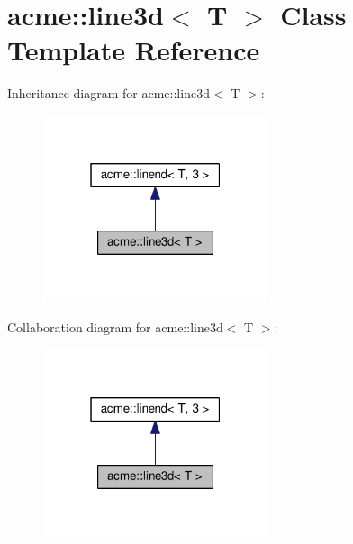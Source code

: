 \hypertarget{classacme_1_1line3d}{}\section{acme\+:\+:line3d$<$ T $>$ Class Template Reference}
\label{classacme_1_1line3d}


Inheritance diagram for acme\+:\+:line3d$<$ T $>$\+:
\nopagebreak
\begin{figure}[H]
\begin{center}
\leavevmode
\includegraphics[width=187pt]{dd/d13/classacme_1_1line3d__inherit__graph}
\end{center}
\end{figure}


Collaboration diagram for acme\+:\+:line3d$<$ T $>$\+:
\nopagebreak
\begin{figure}[H]
\begin{center}
\leavevmode
\includegraphics[width=187pt]{d9/d0d/classacme_1_1line3d__coll__graph}
\end{center}
\end{figure}
